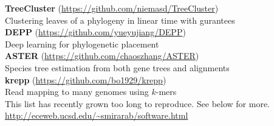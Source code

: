 \documentclass[margin,line,letterpaper]{resume}
\begin{document}
\begin{resume}
\textbf{TreeCluster} (\url{https://github.com/niemasd/TreeCluster})\\
Clustering leaves of a phylogeny in linear time with gurantees
\vspace{2mm}\\
\textbf{DEPP} (\url{https://github.com/yueyujiang/DEPP})\\
Deep learning for phylogenetic placement
\vspace{2mm}\\
\textbf{ASTER} (\url{https://github.com/chaoszhang/ASTER})\\
Species tree estimation from  both gene trees and alignments \vspace{2mm}\\
\textbf{krepp} (\url{https://github.com/bo1929/krepp})\\
Read mapping to many genomes using $k$-mers \vspace{2mm}\\
This list has recently grown too long to reproduce. 
See below for more. \\
\url{http://eceweb.ucsd.edu/~smirarab/software.html}

\end{resume}
\end{document}
